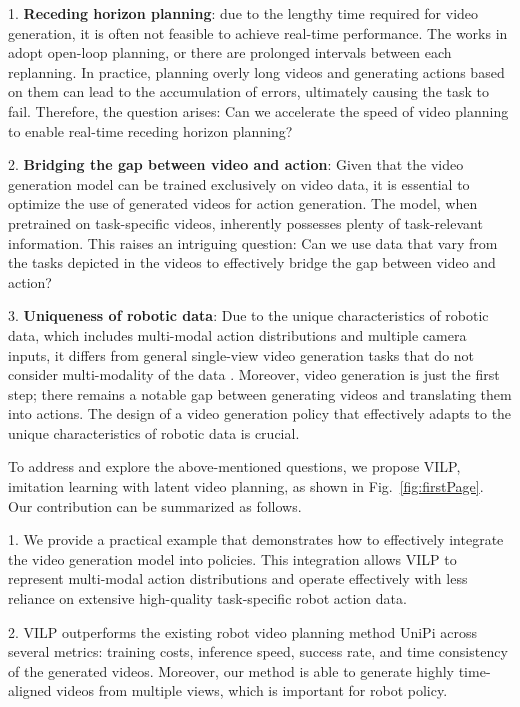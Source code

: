 \documentclass[doublecolumn]{IEEEtran}
\begin{document}
1. \textbf{Receding horizon planning}: due to the lengthy time required for video generation, it is often not feasible to achieve real-time performance. The works in \cite{du2024learning,du2023video,Ko2023Learning} adopt open-loop planning, or there are prolonged intervals between each replanning. In practice, planning overly long videos and generating actions based on them can lead to the accumulation of errors, ultimately causing the task to fail. Therefore, the question arises: {Can we accelerate the speed of video planning to enable real-time receding horizon planning?}

2. \textbf{Bridging the gap between video and action}: 
Given that the video generation model can be trained exclusively on video data, it is essential to optimize the use of generated videos for action generation. The model, when pretrained on task-specific videos, inherently possesses plenty of task-relevant information. This raises an intriguing question: Can we use data that vary from the tasks depicted in the videos to effectively bridge the gap between video and action?

3. {\textbf{Uniqueness of robotic data}: Due to the unique characteristics of robotic data, which includes multi-modal action distributions and multiple camera inputs, it differs from general single-view video generation tasks that do not consider multi-modality of the data \cite{ge2022long,yu2023magvit,yan2021videogpt}. Moreover, video generation is just the first step; there remains a notable gap between generating videos and translating them into actions. The design of a video generation policy that effectively adapts to the unique characteristics of robotic data is crucial. }




To address and explore the above-mentioned questions, we propose VILP, imitation learning with latent video planning, as shown in Fig.~\ref{fig:firstPage}. Our contribution can be summarized as follows.


1. {We provide a practical example that demonstrates how to effectively integrate the video generation model into policies. This integration allows VILP to represent multi-modal action distributions and operate effectively with less reliance on extensive high-quality task-specific robot action data.}

2. {VILP outperforms the existing robot video planning method UniPi \cite{du2024learning} across several metrics: training costs, inference speed, success rate, and time consistency of the generated videos. Moreover, our method is able to generate highly time-aligned videos from multiple views, which is important for robot policy.}
\end{document}

